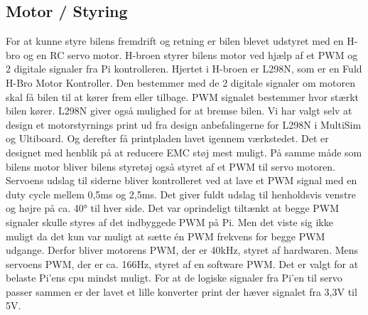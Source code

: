 \subsection{Motor / Styring}

For at kunne styre bilens fremdrift og retning er bilen blevet udstyret med en H-bro og en RC servo motor.
H-broen styrer bilens motor ved hjælp af et PWM og 2 digitale signaler fra Pi kontrolleren. 
Hjertet i H-broen er L298N\cite{lib:L298N_datablad}, som er en Fuld H-Bro Motor Kontroller. 
Den bestemmer med de 2 digitale signaler om motoren skal få bilen til at kører frem eller tilbage. 
PWM signalet bestemmer hvor stærkt bilen kører. 
L298N giver også mulighed for at bremse bilen.\newline 
Vi har valgt selv at design et motorstyrnings  print ud fra design anbefalingerne for L298N  i MultiSim og Ultiboard. 
Og derefter få printpladen lavet igennem værkstedet.
Det er designet med henblik på at reducere EMC støj mest muligt.\newline
På samme måde som bilens motor bliver bilens styretøj også styret af et PWM til servo motoren. 
Servoens udslag til siderne bliver kontrolleret ved at lave et PWM signal med en duty cycle mellem 0,5ms og 2,5ms. 
Det giver fuldt udslag til henholdsvis venstre og højre på ca. 40\si{\degree} til hver side.
Det var oprindeligt tiltænkt at begge PWM signaler skulle styres af det indbyggede PWM på Pi. 
Men det viste sig ikke muligt da det kun var muligt at sætte én PWM frekvens for begge PWM udgange. 
Derfor bliver motorens PWM, der er 40kHz, styret af hardwaren. 
Mens servoens PWM, der er ca. 166Hz, styret af en software PWM. 
Det er valgt for at belaste Pi'ens cpu mindst muligt.
For at de logiske signaler fra Pi'en til servo passer sammen er der lavet et lille konverter print der hæver signalet fra 3,3V til 5V.
